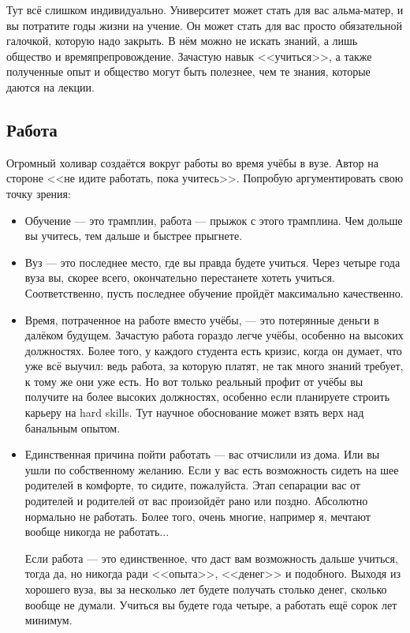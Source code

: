 \documentclass[12pt, a4paper]{article}
\begin{document}
Тут всё слишком индивидуально. Университет может стать для вас альма-матер, и вы потратите годы жизни на учение. Он может стать для вас просто обязательной галочкой, которую надо закрыть. В нём можно не искать знаний, а лишь общество и времяпрепровождение. Зачастую навык <<учиться>>, а также полученные опыт и общество могут быть полезнее, чем те знания, которые даются на лекции. 

\subsection{Работа}

Огромный холивар создаётся вокруг работы во время учёбы в вузе. Автор на стороне <<не идите работать, пока учитесь>>. Попробую аргументировать свою точку зрения:
\begin{itemize}
    \item Обучение --- это трамплин, работа --- прыжок с этого трамплина. Чем дольше вы учитесь, тем дальше и быстрее прыгнете.
    \item Вуз --- это последнее место, где вы правда будете учиться. Через четыре года вуза вы, скорее всего, окончательно перестанете хотеть учиться. Соответственно, пусть последнее обучение пройдёт максимально качественно.
    \item Время, потраченное на работе вместо учёбы, --- это потерянные деньги в далёком будущем. Зачастую работа гораздо легче учёбы, особенно на высоких должностях. Более того, у каждого студента есть кризис, когда он думает, что уже всё выучил: ведь работа, за которую платят, не так много знаний требует, к тому же они уже есть. Но вот только реальный профит от учёбы вы получите на более высоких должностях, особенно если планируете строить карьеру на hard skills. Тут научное обоснование может взять верх над банальным опытом. 
    \item Единственная причина пойти работать --- вас отчислили из дома. Или вы ушли по собственному желанию. Если у вас есть возможность сидеть на шее родителей в комфорте, то сидите, пожалуйста. Этап сепарации вас от родителей и родителей от вас произойдёт рано или поздно. Абсолютно нормально не работать. Более того, очень многие, например я, мечтают вообще никогда не работать...
    
    Если работа --- это единственное, что даст вам возможность дальше учиться, тогда да, но никогда ради <<опыта>>, <<денег>> и подобного. Выходя из хорошего вуза, вы за несколько лет будете получать столько денег, сколько вообще не думали. Учиться вы будете года четыре, а работать ещё сорок лет минимум.
\end{itemize}
\end{document}

